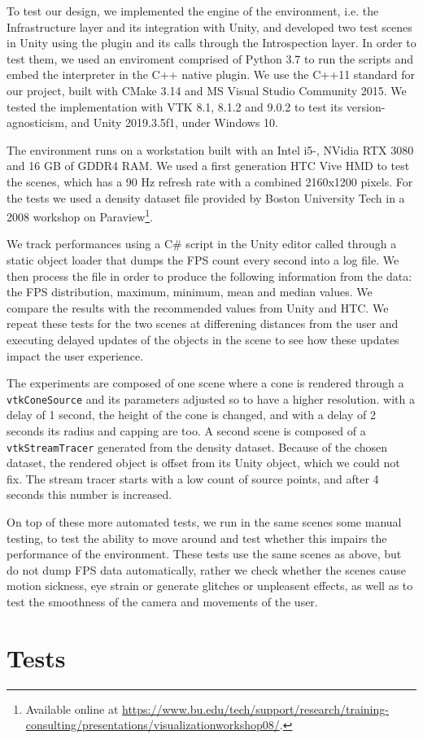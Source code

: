 To test our design, we implemented the engine of the environment, i.e. the Infrastructure layer and its integration with Unity, and developed two test scenes in Unity using the plugin and its calls through the Introspection layer. In order to test them, we used an enviroment comprised of Python 3.7 to run the scripts and embed the interpreter in the C++ native plugin. We use the C++11 standard for our project, built with CMake 3.14 and MS Visual Studio Community 2015. We tested the implementation with VTK 8.1, 8.1.2 and 9.0.2 to test its version-agnosticism, and Unity 2019.3.5f1, under Windows 10.

The environment runs on a workstation built with an Intel i5-, NVidia RTX 3080 and 16 GB of GDDR4 RAM. We used a first generation HTC Vive HMD to test the scenes, which has a 90 Hz refresh rate with a combined 2160x1200 pixels. For the tests we used a density dataset file provided by Boston University Tech in a 2008 workshop on Paraview\footnote{Available online at \url{https://www.bu.edu/tech/support/research/training-consulting/presentations/visualizationworkshop08/}.}. 

We track performances using a C\# script in the Unity editor called through a static object loader that dumps the FPS count every second into a log file. We then process the file in order to produce the following information from the data: the FPS distribution, maximum, minimum, mean and median values. We compare the results with the recommended values from Unity and HTC. We repeat these tests for the two scenes at differening distances from the user and executing delayed updates of the objects in the scene to see how these updates impact the user experience.

The experiments are composed of one scene where a cone is rendered through a \verb|vtkConeSource| and its parameters adjusted so to have a higher resolution. with a delay of 1 second, the height of the cone is changed, and with a delay of 2 seconds its radius and capping are too. A second scene is composed of a \verb|vtkStreamTracer| generated from the density dataset. Because of the chosen dataset, the rendered object is offset from its Unity object, which we could not fix. The stream tracer starts with a low count of source points, and after 4 seconds this number is increased.

On top of these more automated tests, we run in the same scenes some manual testing, to test the ability to move around and test whether this impairs the performance of the environment. These tests use the same scenes as above, but do not dump FPS data automatically, rather we check whether the scenes cause motion sickness, eye strain or generate glitches or unpleasent effects, as well as to test the smoothness of the camera and movements of the user.

\section{Tests}


